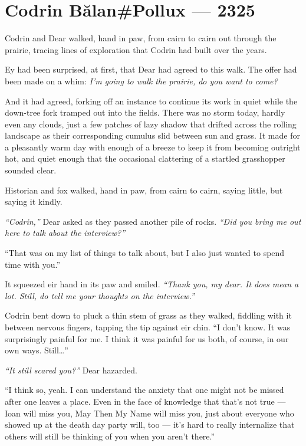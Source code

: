 \hypertarget{codrin-bux103lanpollux-2325}{%
\chapter{Codrin Bălan\#Pollux — 2325}\label{codrin-bux103lanpollux-2325}}

Codrin and Dear walked, hand in paw, from cairn to cairn out through the prairie, tracing lines of exploration that Codrin had built over the years.

Ey had been surprised, at first, that Dear had agreed to this walk. The offer had been made on a whim: \emph{I'm going to walk the prairie, do you want to come?}

And it had agreed, forking off an instance to continue its work in quiet while the down-tree fork tramped out into the fields. There was no storm today, hardly even any clouds, just a few patches of lazy shadow that drifted across the rolling landscape as their corresponding cumulus slid between sun and grass. It made for a pleasantly warm day with enough of a breeze to keep it from becoming outright hot, and quiet enough that the occasional clattering of a startled grasshopper sounded clear.

Historian and fox walked, hand in paw, from cairn to cairn, saying little, but saying it kindly.

\emph{``Codrin,''} Dear asked as they passed another pile of rocks. \emph{``Did you bring me out here to talk about the interview?''}

``That was on my list of things to talk about, but I also just wanted to spend time with you.''

It squeezed eir hand in its paw and smiled. \emph{``Thank you, my dear. It does mean a lot. Still, do tell me your thoughts on the interview.''}

Codrin bent down to pluck a thin stem of grass as they walked, fiddling with it between nervous fingers, tapping the tip against eir chin. ``I don't know. It was surprisingly painful for me. I think it was painful for us both, of course, in our own ways. Still\ldots{}''

\emph{``It still scared you?''} Dear hazarded.

``I think so, yeah. I can understand the anxiety that one might not be missed after one leaves a place. Even in the face of knowledge that that's not true — Ioan will miss you, May Then My Name will miss you, just about everyone who showed up at the death day party will, too — it's hard to really internalize that others will still be thinking of you when you aren't there.''

